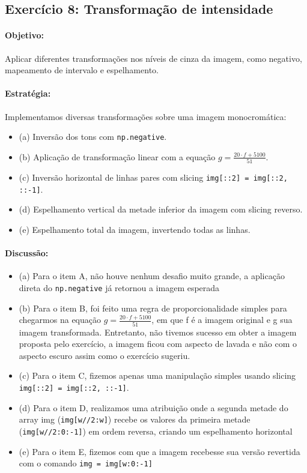 \documentclass[12pt,a4paper]{report}
\begin{document}
\subsection{Exercício 8: Transformação de intensidade}
\paragraph{Objetivo:} 
Aplicar diferentes transformações nos níveis de cinza da imagem, como negativo, mapeamento de intervalo e espelhamento.

\paragraph{Estratégia:} 
Implementamos diversas transformações sobre uma imagem monocromática:
\begin{itemize}
  \item (a) Inversão dos tons com \texttt{np.negative}.
  \item (b) Aplicação de transformação linear com a equação $g = \frac{20 \cdot f + 5100}{51}$.
  \item (c) Inversão horizontal de linhas pares com slicing \texttt{img[::2] = img[::2, ::-1]}.
  \item (d) Espelhamento vertical da metade inferior da imagem com slicing reverso.
  \item (e) Espelhamento total da imagem, invertendo todas as linhas.
\end{itemize}

\paragraph{Discussão:} 
\begin{itemize}
  \item (a) Para o item A, não houve nenhum desafio muito grande, a aplicação direta do \texttt{np.negative} já retornou a imagem esperada
  \item (b) Para o item B, foi feito uma regra de proporcionalidade simples para chegarmos na equação $g = \frac{20 \cdot f + 5100}{51}$, em que f é a imagem original e g sua imagem transformada. Entretanto, não tivemos sucesso em obter a imagem proposta pelo exercício, a imagem ficou com aspecto de lavada e não com o aspecto escuro assim como o exercício sugeriu.
  \item (c) Para o item C, fizemos apenas uma manipulação simples usando slicing \texttt{img[::2] = img[::2, ::-1]}.
  \item (d) Para o item D, realizamos uma atribuição onde a segunda metade do array img (\texttt{img[w//2:w]}) recebe os valores da primeira metade (\texttt{img[w//2:0:-1]}) em ordem reversa, criando um espelhamento horizontal
  \item (e) Para o item E, fizemos com que a imagem recebesse sua versão revertida com o comando \texttt{img = img[w:0:-1]}
\end{itemize}
\end{document}
